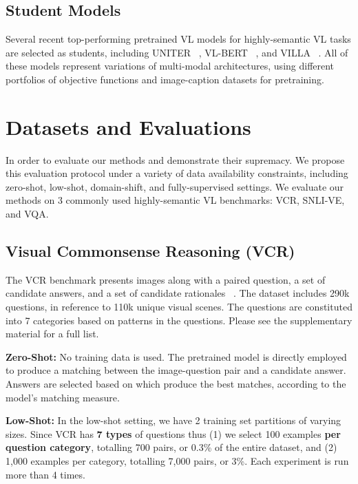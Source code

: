 \documentclass[runningheads]{llncs}
\begin{document}
\subsection{Student Models}
Several recent top-performing pretrained VL models for highly-semantic VL tasks are selected as students, including UNITER ~\cite{chen2020uniter}, VL-BERT ~\cite{Su2020VL-BERT}, and VILLA ~\cite{gan2020large}. All of these models represent variations of multi-modal architectures, using different portfolios of objective functions and image-caption datasets for pretraining.



\section{Datasets and Evaluations}
In order to evaluate our methods and demonstrate their supremacy. We propose this evaluation protocol under a variety of data availability constraints, including zero-shot, low-shot, domain-shift, and fully-supervised settings. We evaluate our methods on 3 commonly used highly-semantic VL benchmarks: VCR, SNLI-VE, and VQA.



\subsection{Visual Commonsense Reasoning (VCR)}

The VCR benchmark presents images along with a paired question, a set of candidate answers, and a set of candidate rationales ~\cite{zellers2019vcr}. The dataset includes 290k questions, in reference to 110k unique visual scenes. The questions are constituted into 7 categories based on patterns in the questions. Please see the supplementary material for a full list.


{\bf \noindent Zero-Shot:}
No training data is used. The pretrained model is directly employed to produce a matching between the image-question pair and a candidate answer. Answers are selected based on which produce the best matches, according to the model's matching measure.

{\bf \noindent Low-Shot:}
In the low-shot setting, we have 2 training set partitions of varying sizes. Since VCR has \textbf{7 types} of questions thus (1) we select 100 examples \textbf{per question category}, totalling 700 pairs, or 0.3\% of the entire dataset, and  (2) 1,000 examples per category, totalling 7,000 pairs, or 3\%. Each experiment is run more than 4 times.
\end{document}
